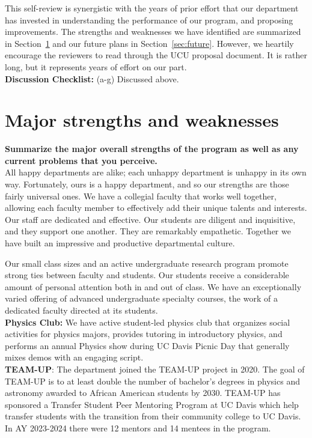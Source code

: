 \documentclass[12pt]{article}
\begin{document}
This self-review is synergistic with the years of prior effort that
our department has invested in understanding the performance of our
program, and proposing improvements.  The strengths and weaknesses we
have identified are summarized in Section~\ref{sec:snws} and our
future plans in Section~\ref{sec:future}.  However, we heartily
encourage the reviewers to read through the UCU proposal document.  It
is rather long, but it represents years of effort on our part.\\[3pt]

\noindent
{\bf Discussion Checklist:} (a-g) Discussed above.

\newpage
\section{Major strengths and weaknesses}
\label{sec:snws}

{\bf Summarize the major overall strengths of the program as well as
  any current problems that you perceive.}\\[3pt]

\noindent
All happy departments are alike; each unhappy department is unhappy in
its own way.  Fortunately, ours is a happy department, and so our
strengths are those fairly universal ones.  We have a collegial
faculty that works well together, allowing each faculty member to
effectively add their unique talents and interests.  Our staff are
dedicated and effective.  Our students are diligent and inquisitive,
and they support one another.  They are remarkably empathetic.
Together we have built an impressive and productive departmental
culture.

Our small class sizes and an active undergraduate research program
promote strong ties between faculty and students.  Our students
receive a considerable amount of personal attention both in and out of
class.  We have an exceptionally varied offering of advanced
undergraduate specialty courses, the work of a dedicated faculty
directed at its students.\\[3pt]

\noindent
{\bf Physics Club:} We have active student-led physics club that organizes social activities for physics majors, provides tutoring in introductory physics, and performs an annual Physics show during UC Davis Picnic Day that generally mixes demos with an engaging script.\\[3pt]

\noindent
{\bf TEAM-UP}:
The department joined the TEAM-UP project in 2020.  The goal of TEAM-UP is to at least double the number of bachelor’s degrees in physics and astronomy awarded to African American students by 2030.
TEAM-UP has sponsored a Transfer Student Peer Mentoring Program at UC Davis which help transfer students with the transition from their community college to UC Davis.  In AY 2023-2024 there were 12 mentors and 14 mentees in the program.\\[3pt]
\end{document}
